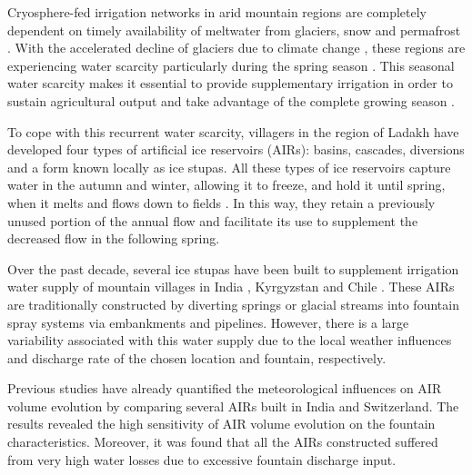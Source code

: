 \documentclass[tc, manuscript]{copernicus}
\begin{document}
\introduction

Cryosphere-fed irrigation networks in arid mountain regions are completely dependent on timely availability of
meltwater from glaciers, snow and permafrost \citep{farhanHydrologicalRegimesConjunction2015}. With the
accelerated decline of glaciers due to climate change \citep{nusserLocalKnowledgeGlobal2016}, these regions are
experiencing water scarcity particularly during the spring season \citep{norphelSnowWaterHarvesting2015}. This
seasonal water scarcity makes it essential to provide supplementary irrigation in order to sustain agricultural
output and take advantage of the complete growing season \citep{nusserLocalKnowledgeGlobal2016,
vincentEnergyClimateChange2009}.

To cope with this recurrent water scarcity, villagers in the region of Ladakh have developed four types of
artificial ice reservoirs (AIRs): basins, cascades, diversions and a form known locally as ice stupas. All these
types of ice reservoirs capture water in the autumn and winter, allowing it to freeze, and hold it until spring,
when it melts and flows down to fields \citep{vinceGlacierMan2009, clouseLadakhArtificialGlaciers2017,
nusserSociohydrologyArtificialGlaciers2019, ipccChapterHighMountain2019}. In this way, they retain a previously
unused portion of the annual flow and facilitate its use to supplement the decreased flow in the following
spring. 

Over the past decade, several ice stupas have been built to supplement irrigation water supply of mountain
villages in India \citep{wangchukIceStupaCompetition2020, palmerStoringFrozenWater2022,
aggarwalAdaptationClimateChange2021}, Kyrgyzstan \citep{bbcnewsBrightArtificialGlacier2020} and Chile
\citep{reutersConservationistsChileAim2021}. These AIRs are traditionally constructed by diverting springs or
glacial streams into fountain spray systems via embankments and pipelines. However, there is a large variability
associated with this water supply due to the local weather influences and discharge rate of the chosen location
and fountain, respectively. 

Previous studies \citep{balasubramanianInfluenceMeteorologicalConditions2022,
oerlemansBriefCommunicationGrowth2021} have already quantified the meteorological influences on AIR volume
evolution by comparing several AIRs built in India and Switzerland. The results revealed the high sensitivity of
AIR volume evolution on the fountain characteristics. Moreover, it was found that all the AIRs constructed
suffered from very high water losses due to excessive fountain discharge input. 
\end{document}
